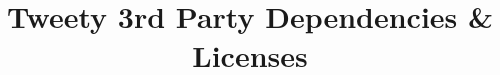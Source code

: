 \documentclass[10pt, a4paper, final]{article}
\title{Tweety 3rd Party Dependencies \& Licenses\\ \color{red}{Draft!}}
\begin{document}



\maketitle
\newcommand{\junit}{& JUnit 				& 4.9 		& yes	& EPL v1.0\\}
\newcommand{\lbcore}{& Logback Core 		& 0.9.30		& yes	& EPL v1.0 \& LGPL v2.1\\}
\newcommand{\lbclassic}{& Logback Classic 	& 0.9.30		& yes	&	EPL v1.0 \& LGPL v2.1 \\}
\newcommand{\slf}{& SLF4J 				& 1.6.3 		& yes	& MIT License\\}
\newcommand{\satcore}{& Sat4J	Core			& 2.3.4		& yes	& EPL v1.0 \& LGPL v2.1	\\}
\newcommand{\jspf}{& JSPF				& 1.0.2		& yes	& 3-clause BSD \\}
\newcommand{\javacc}{& JavaCC				& 2.6 (?)	& yes	& BSD\\}
\newcommand{\logforj}{& Log4J				& 1.6.3		& yes	& Apache License v2.0\\ }
\newcommand{\jama}{& jama				& 1.0.3		& yes	& Public Domain	\\}
\newcommand{\scalalib}{& scala-library		&	2.10.3		& yes	& 3-clause BSD 	\\}
\newcommand{\lbfgs}{& lbfgs 	& 0.1	 & ? 	& GPL v2+ \& Apache License v2 \\}
\newcommand{\ojalgo}{& ojAlgo 	& 35	 & yes	& MIT License	\\}
\newcommand{\hamcrest}{& hamcrest core 	& 1.1 & yes	& 3-clause BSD	\\}
\newcommand{\lpsolve}{& lpSolve 	& 5.5.2	 & no & LGPL v2	\\}
\newcommand{\lingeling}{& Lingeling & ? & no & GPL (old)/Restricted (newer)\\}
\newcommand{\marco}{& MARCO & ? & no & ?\\}
\newcommand{\python}{& Python & 2.7/3.3 (?) & no & - \\}
\end{document}
